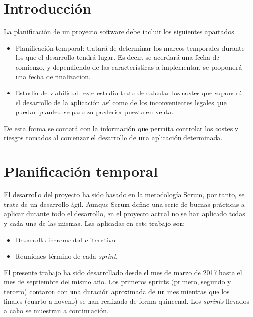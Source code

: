 
\section{Introducción}

La planificación de un proyecto software debe incluir los siguientes apartados:

\begin{itemize}
	\item Planificación temporal: tratará de determinar los marcos temporales durante los que el desarrollo tendrá lugar. Es decir, se acordará una fecha de comienzo, y dependiendo de las características a implementar, se propondrá una fecha de finalización. 
	\item Estudio de viabilidad: este estudio trata de calcular los costes que supondrá el desarrollo de la aplicación así como de los inconvenientes legales que puedan plantearse para su posterior puesta en venta.
\end{itemize}

De esta forma se contará con la información que permita controlar los costes y riesgos tomados al comenzar el desarrollo de una aplicación determinada.

\section{Planificación temporal}

El desarrollo del proyecto ha sido basado en la metodología Scrum, por tanto, se trata de un desarrollo ágil. Aunque Scrum define una serie de buenas prácticas a aplicar durante todo el desarrollo, en el proyecto actual no se han aplicado todas y cada una de las mismas. Las aplicadas en este trabajo son:

\begin{itemize}
	\item Desarrollo incremental e iterativo.
	\item Reuniones término de cada \textit{sprint}.
\end{itemize}

El presente trabajo ha sido desarrollado desde el mes de marzo de 2017 hasta el mes de septiembre del mismo año. Los primeros sprints (primero, segundo y tercero) contaron con una duración aproximada de un mes mientras que los finales (cuarto a noveno) se han realizado de forma quincenal. 
Los \textit{sprints} llevados a cabo se muestran a continuación.

